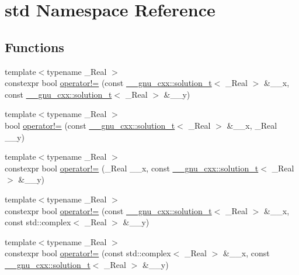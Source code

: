 \hypertarget{namespacestd}{}\section{std Namespace Reference}
\label{namespacestd}
\subsection*{Functions}
\begin{DoxyCompactItemize}
\item 
{\footnotesize template$<$typename \+\_\+\+Real $>$ }\\constexpr bool \hyperlink{namespacestd_a0f89c0cd89caea7c7413c22c4c7e21f9}{operator!=} (const \hyperlink{namespace____gnu__cxx_ae20ea642de50eb361074c62676b0159c}{\+\_\+\+\_\+gnu\+\_\+cxx\+::solution\+\_\+t}$<$ \+\_\+\+Real $>$ \&\+\_\+\+\_\+x, const \hyperlink{namespace____gnu__cxx_ae20ea642de50eb361074c62676b0159c}{\+\_\+\+\_\+gnu\+\_\+cxx\+::solution\+\_\+t}$<$ \+\_\+\+Real $>$ \&\+\_\+\+\_\+y)
\item 
{\footnotesize template$<$typename \+\_\+\+Real $>$ }\\bool \hyperlink{namespacestd_a88548a06c4013d8e23c70a25a48a8929}{operator!=} (const \hyperlink{namespace____gnu__cxx_ae20ea642de50eb361074c62676b0159c}{\+\_\+\+\_\+gnu\+\_\+cxx\+::solution\+\_\+t}$<$ \+\_\+\+Real $>$ \&\+\_\+\+\_\+x, \+\_\+\+Real \+\_\+\+\_\+y)
\item 
{\footnotesize template$<$typename \+\_\+\+Real $>$ }\\constexpr bool \hyperlink{namespacestd_ac8ab440760f8eab57232be8417861387}{operator!=} (\+\_\+\+Real \+\_\+\+\_\+x, const \hyperlink{namespace____gnu__cxx_ae20ea642de50eb361074c62676b0159c}{\+\_\+\+\_\+gnu\+\_\+cxx\+::solution\+\_\+t}$<$ \+\_\+\+Real $>$ \&\+\_\+\+\_\+y)
\item 
{\footnotesize template$<$typename \+\_\+\+Real $>$ }\\constexpr bool \hyperlink{namespacestd_a613014e2e7afb3c131c9530988e20417}{operator!=} (const \hyperlink{namespace____gnu__cxx_ae20ea642de50eb361074c62676b0159c}{\+\_\+\+\_\+gnu\+\_\+cxx\+::solution\+\_\+t}$<$ \+\_\+\+Real $>$ \&\+\_\+\+\_\+x, const std\+::complex$<$ \+\_\+\+Real $>$ \&\+\_\+\+\_\+y)
\item 
{\footnotesize template$<$typename \+\_\+\+Real $>$ }\\constexpr bool \hyperlink{namespacestd_ad62f982d25741aa725c67cb3380782d9}{operator!=} (const std\+::complex$<$ \+\_\+\+Real $>$ \&\+\_\+\+\_\+x, const \hyperlink{namespace____gnu__cxx_ae20ea642de50eb361074c62676b0159c}{\+\_\+\+\_\+gnu\+\_\+cxx\+::solution\+\_\+t}$<$ \+\_\+\+Real $>$ \&\+\_\+\+\_\+y)

\end{DoxyCompactItemize}
